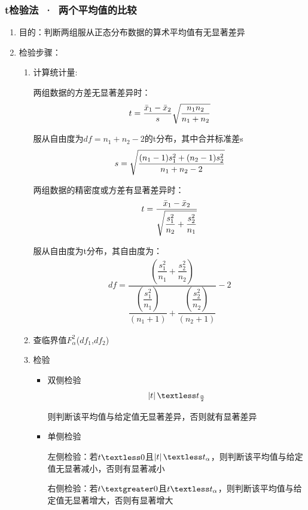 \documentclass[UTF8]{ctexart}
\begin{document}
\subsubsection{t检验法\ ·\ 两个平均值的比较}
\begin{enumerate}[•]
  \item 目的：判断两组服从正态分布数据的算术平均值有无显著差异
  \item 检验步骤：
  \begin{enumerate}[1.]
    \item 计算统计量:
\par 两组数据的方差无显著差异时：
\begin{equation}\notag
t=\frac{\bar{x}_{1}-\bar{x}_{2}}{s} \sqrt{\frac{n_{1}n_{2}}{n_{1}+n_{2}} } 
\end{equation}
\par \qquad 服从自由度为$df=n_{1}+n_{2}-2$的t分布，其中合并标准差s
\begin{equation}\notag
s=\sqrt{\frac{(n_{1}-1)s_{1}^{2}+(n_{2}-1)s_{2}^{2}}{n_{1}+n_{2}-2} } 
\end{equation}

\par 两组数据的精密度或方差有显著差异时：
\begin{equation}\notag
t=\frac{\bar{x}_{1}-\bar{x}_{2}}{\sqrt{\dfrac{s^{2}_{1}}{n_2}+\dfrac{s^{2}_{2}}{n_1}} } 
\end{equation}
\par \qquad 服从自由度为t分布，其自由度为：
\begin{equation*}
  \begin{aligned}
    df=
    \dfrac{(\dfrac{s^{2}_{1}}{n_1}+\dfrac{s^{2}_{2}}{n_2})}
    {{
        \dfrac{(\dfrac{s^{2}_{1}}{n_1})}{(n_{1}+1)}}
    +
    {    \dfrac{(\dfrac{s^{2}_{2}}{n_2})}{(n_{2}+1)}
    }}
    -2
  \end{aligned}
\end{equation*}



    \item 查临界值$F^{2}_{\alpha}$($df_{1}$,$df_{2}$)
    \item 检验
    \begin{itemize}
    \item 双侧检验
      \begin{equation}\notag
      \left\lvert t\right\rvert \textless t_{\frac{\alpha }{2} }
      \end{equation}
      \par \quad 则判断该平均值与给定值无显著差异，否则就有显著差异
    \item 单侧检验
      \par\quad 左侧检验：若$t\textless 0$且$\left\lvert t\right\rvert \textless t_{\alpha}$，则判断该平均值与给定值无显著减小，否则有显著减小
      \par\quad 右侧检验：若$t\textgreater 0$且$ t \textless t_{\alpha}$，则判断该平均值与给定值无显著增大，否则有显著增大
    \end{itemize} 
  \end{enumerate}
\end{enumerate}
\end{document}
